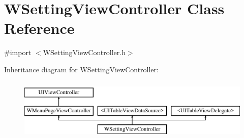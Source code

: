 \hypertarget{interface_w_setting_view_controller}{\section{W\-Setting\-View\-Controller Class Reference}
\label{interface_w_setting_view_controller}
}


{\ttfamily \#import $<$W\-Setting\-View\-Controller.\-h$>$}

Inheritance diagram for W\-Setting\-View\-Controller\-:\begin{figure}[H]
\begin{center}
\leavevmode
\includegraphics[height=3.000000cm]{interface_w_setting_view_controller}
\end{center}
\end{figure}
